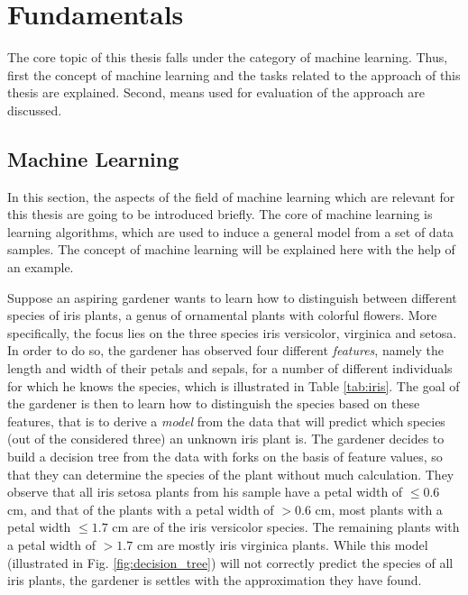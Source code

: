 %
\chapter{Fundamentals}
\label{sec:fundamentals}

The core topic of this thesis falls under the category of machine learning. Thus, first the concept of machine learning and the tasks related to the approach of this thesis are explained. Second, means used for evaluation of the approach are discussed.

\section{Machine Learning}
In this section, the aspects of the field of machine learning which are relevant for this thesis are going to be introduced briefly. The core of machine learning is learning algorithms, which are used to induce a general model from a set of data samples. The concept of machine learning will be explained here with the help of an example. %

Suppose an aspiring gardener wants to learn how to distinguish between different species of iris plants, a genus of ornamental plants with colorful flowers. More specifically, the focus lies on the three species iris versicolor, virginica and setosa. In order to do so, the gardener has observed four different \textit{features}, namely the length and width of their petals and sepals, for a number of different individuals for which he knows the species, which is illustrated in Table \ref{tab:iris}. The goal of the gardener is then to learn how to distinguish the species based on these features, that is to derive a \textit{model} from the data that will predict which species (out of the considered three) an unknown iris plant is. The gardener decides to build a decision tree from the data with forks on the basis of feature values, so that they can determine the species of the plant without much calculation. They observe that all iris setosa plants from his sample have a petal width of $\leq 0.6 $ cm, and that of the plants with a petal width of $>0.6$ cm, most plants with a petal width $\leq 1.7$ cm are of the iris versicolor species. The remaining plants with a petal width of $>1.7$ cm are mostly iris virginica plants. While this model (illustrated in Fig. \ref{fig:decision_tree}) will not correctly predict the species of all iris plants, the gardener is settles with the approximation they have found.

